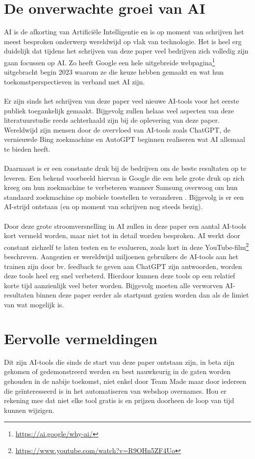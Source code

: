 \section{De onverwachte groei van AI}
AI is de afkorting van Artificiële Intelligentie en is op moment van schrijven het meest besproken onderwerp wereldwijd op vlak van technologie. Het is heel erg duidelijk dat tijdens het schrijven van deze paper veel bedrijven zich volledig zijn gaan focussen op AI. Zo heeft Google een hele uitgebreide webpagina\footnote{\href{https://ai.google/why-ai/}{https://ai.google/why-ai/}} uitgebracht begin 2023 waarom ze die keuze hebben gemaakt en wat hun toekomstperspectieven in verband met AI zijn.
\\\\
Er zijn sinds het schrijven van deze paper veel nieuwe AI-tools voor het eerste publiek toegankelijk gemaakt. Bijgevolg zullen helaas veel aspecten van deze literatuurstudie reeds achterhaald zijn bij de oplevering van deze paper. Wereldwijd zijn mensen door de overvloed van AI-tools zoals ChatGPT, de vernieuwde Bing zoekmachine en AutoGPT beginnen realiseren wat AI allemaal te bieden heeft.
\\\\
Daarnaast is er een constante druk bij de bedrijven om de beste resultaten op te leveren. Een bekend voorbeeld hiervan is Google die een hele grote druk op zich kreeg om hun zoekmachine te verbeteren wanneer Samsung overwoog om hun standaard zoekmachine op mobiele toestellen te veranderen \autocite{Paris2023}. Bijgevolg is er een AI-strijd ontstaan (en op moment van schrijven nog steeds bezig). 
\\\\
Door deze grote stroomversnelling in AI zullen in deze paper een aantal AI-tools kort vermeld worden, maar niet tot in detail worden besproken. AI werkt door constant zichzelf te laten testen en te evalueren, zoals kort in deze YouTube-film\footnote{\href{https://www.youtube.com/watch?v=R9OHn5ZF4Uo}{https://www.youtube.com/watch?v=R9OHn5ZF4Uo}} beschreven. Aangezien er wereldwijd miljoenen gebruikers de AI-tools aan het trainen zijn door bv. feedback te geven aan ChatGPT zijn antwoorden, worden deze tools heel erg snel verbeterd. Hierdoor kunnen deze tools op een relatief korte tijd aanzienlijk veel beter worden. Bijgevolg moeten alle verworven AI-resultaten binnen deze paper eerder als startpunt gezien worden dan als de limiet van wat mogelijk is.
\section{Eervolle vermeldingen}
Dit zijn AI-tools die sinds de start van deze paper ontstaan zijn, in beta zijn gekomen of gedemonstreerd werden en best nauwkeurig in de gaten worden gehouden in de nabije toekomst, niet enkel door Team Made maar door iedereen die geïnteresseerd is in het automatiseren van webshop overnames. Hou er rekening mee dat niet elke tool gratis is en prijzen doorheen de loop van tijd kunnen wijzigen.
